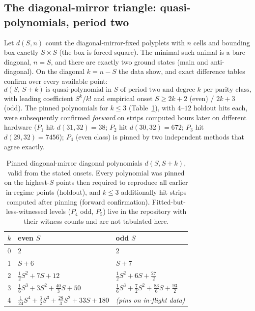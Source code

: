 \documentclass[11pt]{article}
\begin{document}
\subsection{The diagonal-mirror triangle: quasi-polynomials, period two}
\label{sec:dmdiag}

Let $d(S,n)$ count the diagonal-mirror-fixed polyplets with $n$ cells and
bounding box exactly $S\times S$ (the box is forced square). The minimal such
animal is a bare diagonal, $n=S$, and there are exactly two ground states
(main and anti-diagonal). On the diagonal $k=n-S$ the data show, and exact
difference tables confirm over every available point:
\[
  d(S,\,S+k)\ \text{is quasi-polynomial in } S \text{ of period two and
  degree } k \text{ per parity class},
\]
with leading coefficient $S^k/k!$ and empirical onset $S\ge 2k+2$ (even) /
$2k+3$ (odd). The pinned polynomials for $k\le3$
(Table~\ref{tab:dmpk}), with $4$--$12$ holdout hits each, were subsequently
confirmed \emph{forward} on strips computed hours later on different hardware
($P_1$ hit $d(31,32)=38$; $P_2$ hit $d(30,32)=672$; $P_3$ hit
$d(29,32)=7456$); $P_4$ (even class) is pinned by two independent methods
that agree exactly.

\begin{table}[H]
  \centering\small
  \begin{tabular}{c l l}
    \toprule
    $k$ & even $S$ & odd $S$\\
    \midrule
    0 & $2$ & $2$\\
    1 & $S+6$ & $S+7$\\
    2 & $\tfrac12S^2+7S+12$ & $\tfrac12S^2+6S+\tfrac{27}{2}$\\
    3 & $\tfrac16S^3+3S^2+\tfrac{40}{3}S+50$ &
        $\tfrac16S^3+\tfrac72S^2+\tfrac{83}{6}S+\tfrac{93}{2}$\\
    4 & $\tfrac1{24}S^4+\tfrac32S^3+\tfrac{28}{3}S^2+33S+180$ &
        \emph{(pins on in-flight data)}\\
    \bottomrule
  \end{tabular}
  \caption{Pinned diagonal-mirror diagonal polynomials $d(S,S+k)$, valid from
  the stated onsets. Every polynomial was pinned on the highest-$S$ points
  then required to reproduce all earlier in-regime points (holdout), and
  $k\le3$ additionally hit strips computed after pinning (forward
  confirmation). Fitted-but-less-witnessed levels ($P_4$ odd, $P_5$) live in
  the repository with their witness counts and are not tabulated here.}
  \label{tab:dmpk}
\end{table}
\end{document}
